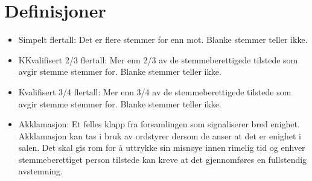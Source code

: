 \setcounter{chapter}{-1}
\chapter{Definisjoner}
\vspace{23pt}

\begin{itemize}
    \item Simpelt flertall: Det er flere stemmer for enn mot. Blanke stemmer teller ikke. 
    \item KKvalifisert 2/3 flertall: Mer enn 2/3 av de stemmeberettigede tilstede som avgir stemme stemmer for. Blanke stemmer teller ikke. 
    \item Kvalifisert 3/4 flertall: Mer enn 3/4 av de stemmeberettigede tilstede som avgir stemme stemmer for. Blanke stemmer teller ikke.
    \item Akklamasjon: Et felles klapp fra forsamlingen som signaliserer bred enighet. Akklamasjon kan tas i bruk av ordstyrer dersom de anser at det er enighet i salen. Det skal gis rom for å uttrykke sin misnøye innen rimelig tid og enhver stemmeberettiget person tilstede kan kreve at det gjennomføres en fullstendig avstemning.
  \end{itemize}

